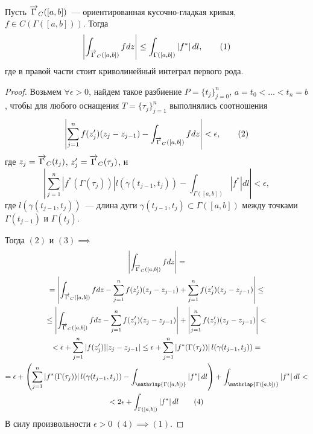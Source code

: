 \documentclass[main]{subfiles}
\begin{document}
\begin{property} 
    Пусть $\AnClOrCurve_C([a,b])$~--- ориентированная кусочно-гладкая кривая, $f \in C(\Gamma([a,b]))$.
    Тогда
    \[\left| \AnClOrInt[\AnClOrCurve_C ([a,b])] f dz \right| \le \int_{\Gamma([a,b])} \left| f^* \right| dl, \tag{1}\]
    где в правой части стоит криволинейный интеграл первого рода.
\end{property}
\begin{proof}
    Возьмем $\forall \epsilon >0$, найдем такое разбиение $P = \{t_j\}_{j=0}^n$, $a=t_0 < \dotsc < t_n = b$, чтобы для любого оснащения $T = \{\tau_j\}_{j=1}^n$ выполнялись соотношения
    \[\left| \sum_{j=1}^{n} f(z_j') (z_j - z_{j-1}) - \AnClOrInt[\AnClOrCurve_C ([a,b])] f dz \right| < \epsilon, \tag{2}\]
    где $z_j = \AnClOrCurve_C (t_j)$, $z_j' = \AnClOrCurve_C(\tau_j)$, и
    \[\left| \sum_{j=1}^{n} \left| f^*(\Gamma(\tau_j)) \right| l(\gamma(t_{j-1}, t_j)) - \int_{\Gamma([a,b])} \left| f^* \right| dl \right| < \epsilon, \tag{3}\]
    где $l(\gamma(t_{j-1}, t_j))$~--- длина дуги $\gamma(t_{j-1}, t_j) \subset \Gamma([a,b])$ между точками $\Gamma(t_{j-1})$ и $\Gamma(t_j)$.

    Тогда $(2)$ и $(3) \implies$
    \begin{multline*}
        \left| \AnClOrInt[\AnClOrCurve_C ([a,b])] f dz \right| = \\
        = \left| \AnClOrInt[\AnClOrCurve_C ([a,b])] f dz - \sum_{j=1}^{n} f(z_j') (z_j - z_{j-1}) + \sum_{j=1}^{n} f(z_j') (z_j - z_{j-1}) \right| \le \\
        \le \left| \AnClOrInt[\AnClOrCurve_C ([a,b])] f dz - \sum_{j=1}^{n} f(z_j') (z_j - z_{j-1}) \right| + \left| \sum_{j=1}^{n} f(z_j') (z_j - z_{j-1}) \right| < \\
        < \epsilon + \sum_{j=1}^{n} |f(z_j')| |z_j - z_{j-1}| \le \epsilon + \sum_{j=1}^{n} \left| f^*(\Gamma(\tau_j)) \right| l(\gamma(t_{j-1}, t_j)) = \\
        = \epsilon + \left( \sum_{j=1}^{n} \left| f^*(\Gamma(\tau_j)) \right| l(\gamma(t_{j-1}, t_j)) - \int_{\mathrlap{\Gamma([a,b])}} \left| f^* \right| dl \right) + \int_{\mathrlap{\Gamma([a,b])}} \left| f^* \right| dl < \\
        < 2\epsilon + \int_{\Gamma([a,b])} \left| f^* \right| dl \tag{4}
    \end{multline*}
    В силу произвольности $\epsilon >0$ $(4) \implies (1)$.
\end{proof}
\end{document}
